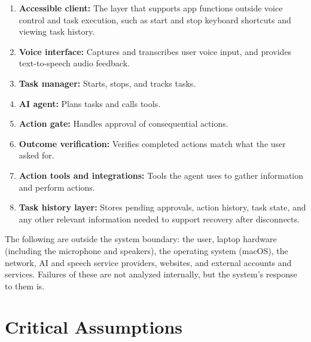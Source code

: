 \documentclass{article}
\begin{document}
\begin{enumerate}
  \item \textbf{Accessible client:} The layer that supports app functions outside voice control and task execution, such as start and stop keyboard shortcuts and viewing task history.
  \item \textbf{Voice interface:} Captures and transcribes user voice input, and provides text-to-speech audio feedback.
  \item \textbf{Task manager:} Starts, stops, and tracks tasks.
  \item \textbf{AI agent:} Plans tasks and calls tools.
  \item \textbf{Action gate:} Handles approval of consequential actions.
  \item \textbf{Outcome verification:} Verifies completed actions match what the user asked for.
  \item \textbf{Action tools and integrations:} Tools the agent uses to gather information and perform actions.
  \item \textbf{Task history layer:} Stores pending approvals, action history, task state, and any other relevant information needed to support recovery after disconnects.
\end{enumerate}
The following are outside the system boundary: the user, laptop hardware (including the microphone and speakers), the operating system (macOS), the network, AI and speech service providers, websites, and external accounts and services. Failures of these are not analyzed internally, but the system's response to them is.

\section{Critical Assumptions}
\end{document}

